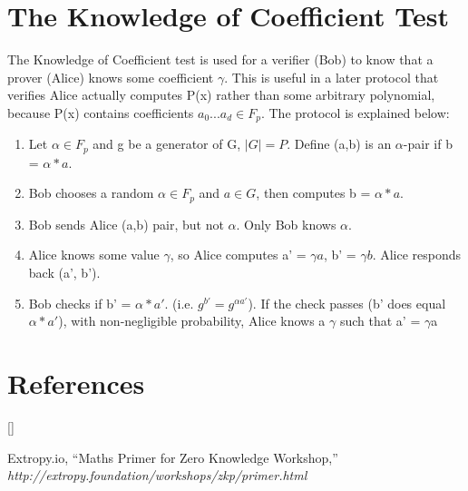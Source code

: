 \documentclass[twoside]{article}
\def\beginrefs{\begin{list}%
        {[\arabic{equation}]}{\usecounter{equation}
         \setlength{\leftmargin}{2.0truecm}\setlength{\labelsep}{0.4truecm}%
         \setlength{\labelwidth}{1.6truecm}}}
\def\endrefs{\end{list}}
\def\bibentry#1{\item[\hbox{[#1]}]}
\begin{document}
\section{The Knowledge of Coefficient Test}
The Knowledge of Coefficient test is used for a verifier (Bob) to know that a prover (Alice) knows some coefficient $\gamma$. This is useful in a later protocol that verifies Alice actually computes P(x) rather than some arbitrary polynomial, because P(x) contains coefficients $a_0...a_d \in F_p$. The protocol is explained below:
\begin{enumerate}
    \item Let $\alpha \in F_p$ and g be a generator of G, $|G| = P$. Define (a,b) is an $\alpha$-pair if b = $\alpha*a$. 
    \item Bob chooses a random $\alpha \in F_p$ and $a \in G$, then computes b = $\alpha * a$.
    \item Bob sends Alice (a,b) pair, but not $\alpha$. Only Bob knows $\alpha$. 
    \item Alice knows some value $\gamma$, so Alice computes a' = $\gamma a$, b' = $\gamma b$. Alice responds back (a', b'). 
    \item Bob checks if b' = $\alpha*a'$. (i.e. $g^{b'} = g^{\alpha a'}$). If the check passes (b' does equal $\alpha*a'$), with non-negligible probability, Alice knows a $\gamma$ such that a' = $\gamma$a
\end{enumerate}

\section*{References}
\beginrefs
\bibentry{1}{\sc Extropy.io}, 
``Maths Primer for Zero Knowledge Workshop,'' \\
{\it http://extropy.foundation/workshops/zkp/primer.html}
\endrefs



\end{document}
